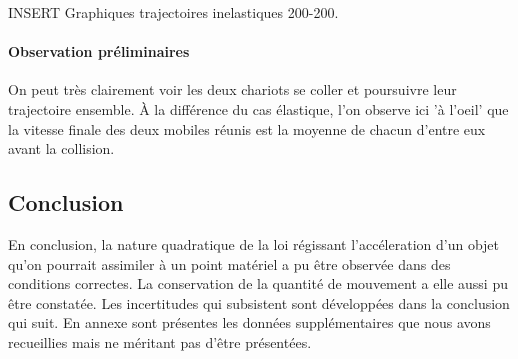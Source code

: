 INSERT Graphiques trajectoires inelastiques 200-200.

\paragraph{Observation préliminaires}
On peut très clairement voir les deux chariots se coller et poursuivre leur trajectoire ensemble.
À la différence du cas élastique, l'on observe ici 'à l'oeil' que la vitesse finale des deux mobiles réunis est la moyenne de chacun d'entre eux avant la collision.

\subsection{Conclusion}
En conclusion, la nature quadratique de la loi régissant l'accéleration d'un objet qu'on pourrait assimiler à un point matériel a pu être observée dans des conditions correctes.
La conservation de la quantité de mouvement a elle aussi pu être constatée. Les incertitudes qui subsistent sont développées dans la conclusion qui suit.
En annexe sont présentes les données supplémentaires que nous avons recueillies mais ne méritant pas d'être présentées.
